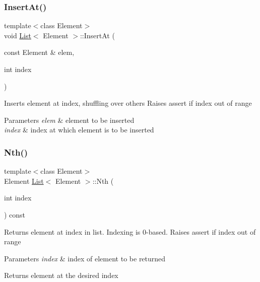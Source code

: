 \subsubsection{\texorpdfstring{Insert\+At()}{InsertAt()}}
{\footnotesize\ttfamily template$<$class Element$>$ \\
void \hyperlink{class_list}{List}$<$ Element $>$\+::Insert\+At (\begin{DoxyParamCaption}\item[{const Element \&}]{elem,  }\item[{int}]{index }\end{DoxyParamCaption})\hspace{0.3cm}{\ttfamily [inline]}}

Inserts element at index, shuffling over others Raises assert if index out of range 
\begin{DoxyParams}{Parameters}
{\em elem} & element to be inserted \\
\hline
{\em index} & index at which element is to be inserted \\
\hline
\end{DoxyParams}
\mbox{\label{class_list_ae5bbd00a0cfcfec0104347a43123911c}} 
\subsubsection{\texorpdfstring{Nth()}{Nth()}}
{\footnotesize\ttfamily template$<$class Element$>$ \\
Element \hyperlink{class_list}{List}$<$ Element $>$\+::Nth (\begin{DoxyParamCaption}\item[{int}]{index }\end{DoxyParamCaption}) const\hspace{0.3cm}{\ttfamily [inline]}}

Returns element at index in list. Indexing is 0-\/based. Raises assert if index out of range 
\begin{DoxyParams}{Parameters}
{\em index} & index of element to be returned \\
\hline
\end{DoxyParams}
\begin{DoxyReturn}{Returns}
element at the desired index 
\end{DoxyReturn}
\mbox{\label{class_list_a7197533d7f956ee56ecb27784b9e647f}} 
